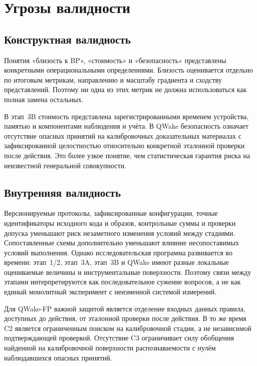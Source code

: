 \section{Угрозы валидности}
\label{sec:discussion-validity}

\subsection{Конструктная валидность}

Понятия «близость к BP», «стоимость» и «безопасность» представлены конкретными
операциональными определениями. Близость оценивается отдельно по итоговым
метрикам, направлению и масштабу градиента и сходству представлений. Поэтому ни
одна из этих метрик не должна использоваться как полная замена остальных.

В этап~3B стоимость представлена зарегистрированными временем устройства,
памятью и компонентами наблюдения и учёта. В QWake безопасность означает
отсутствие опасных принятий на калибровочных доказательных материалах с
зафиксированной целостностью относительно конкретной эталонной проверки после действия.
Это более узкое понятие, чем статистическая гарантия риска на неизвестной
генеральной совокупности.

\subsection{Внутренняя валидность}

Версионируемые протоколы, зафиксированные конфигурации, точные идентификаторы
исходного кода и образов, контрольные суммы и проверки допуска уменьшают риск
незаметного изменения условий между стадиями. Сопоставленные схемы дополнительно
уменьшают влияние несопоставимых условий выполнения. Однако исследовательская
программа развивается во времени: этап~1/2, этап~3A, этап~3B и QWake имеют
разные локальные оцениваемые величины и инструментальные поверхности. Поэтому
связи между этапами интерпретируются как последовательное сужение
вопросов, а не как единый монолитный эксперимент с неизменной системой
измерений.

Для QWake-FP важной защитой является отделение входных данных правила, доступных
до действия, от эталонной проверки после действия. В то же время C2 является ограниченным
поиском на калибровочной стадии, а не независимой подтверждающей проверкой.
Отсутствие C3 ограничивает силу обобщения найденной на калибровочной
поверхности распознаваемости с нулём наблюдавшихся опасных принятий.

